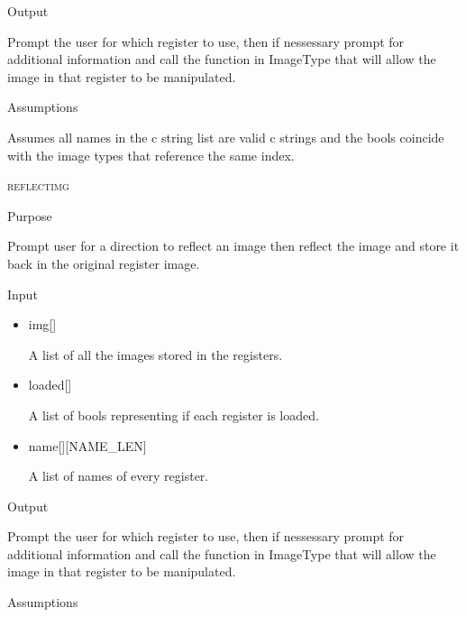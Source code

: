 \documentclass[pdftex, 11pt]{article}
\begin{document}
\begin{description}
\begin{description}
\begin{itemize}
				\end{itemize}

			\item{Output}

				Prompt the user for which register to use, then if nessessary
				prompt for additional information and call the function
				in ImageType that will allow the image in that register to
				be manipulated.

			\item{Assumptions}

				Assumes all names in the c string list are valid c
				strings and the bools coincide with the image types that
				reference the same index.

		\end{description}



	\item{\textsc{reflectimg}}
		\begin{description}
			\item{Purpose}

				Prompt user for a direction to reflect an image then reflect the image and
				store it back in the original register image.

			\item{Input}

				\begin{itemize}

					\item{img[]}

						A list of all the images stored in the registers.

					\item{loaded[]}

						A list of bools representing if each register is loaded.

					\item{name[][NAME\_LEN]}

						A list of names of every register.

				\end{itemize}

			\item{Output}

				Prompt the user for which register to use, then if nessessary
				prompt for additional information and call the function
				in ImageType that will allow the image in that register to
				be manipulated.

			\item{Assumptions}


\end{description}
\end{description}
\end{document}
